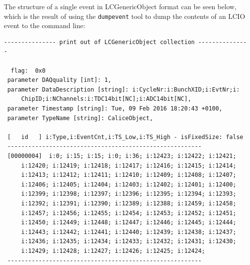 The structure of a single event in LCGenericObject format can be seen below, which is the result of using the \texttt{dumpevent} tool to dump the contents of an \acrshort{LCIO} event to the command line:

\begin{verbatim}
--------------- print out of LCGenericObject collection --------------- 

  flag:  0x0
 parameter DAQquality [int]: 1, 
 parameter DataDescription [string]: i:CycleNr:i:BunchXID;i:EvtNr;i:
     ChipID;i:NChannels:i:TDC14bit[NC];i:ADC14bit[NC],
 parameter Timestamp [string]: Tue, 09 Feb 2016 18:20:43 +0100,
 parameter TypeName [string]: CaliceObject,

 [   id   ] i:Type,i:EventCnt,i:TS_Low,i:TS_High - isFixedSize: false
 --------------------------------------------------------
 [00000004]  i:0; i:15; i:15; i:0; i:36; i:12423; i:12422; i:12421;
     i:12420; i:12419; i:12418; i:12417; i:12416; i:12415; i:12414;
     i:12413; i:12412; i:12411; i:12410; i:12409; i:12408; i:12407;
     i:12406; i:12405; i:12404; i:12403; i:12402; i:12401; i:12400;
     i:12399; i:12398; i:12397; i:12396; i:12395; i:12394; i:12393;
     i:12392; i:12391; i:12390; i:12389; i:12388; i:12459; i:12458;
     i:12457; i:12456; i:12455; i:12454; i:12453; i:12452; i:12451;
     i:12450; i:12449; i:12448; i:12447; i:12446; i:12445; i:12444;
     i:12443; i:12442; i:12441; i:12440; i:12439; i:12438; i:12437;
     i:12436; i:12435; i:12434; i:12433; i:12432; i:12431; i:12430;
     i:12429; i:12428; i:12427; i:12426; i:12425; i:12424;
 --------------------------------------------------------
\end{verbatim}

%
%

